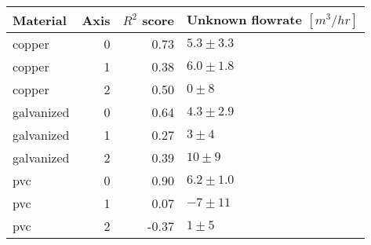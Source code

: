 \begin{tabular}{lrrl}
\toprule
\textbf{Material} & \textbf{Axis} & \textbf{$R^2$ score} & \textbf{Unknown flowrate $[m^3 / hr]$} \\
\midrule
copper & 0 & 0.73 & $5.3 \pm 3.3$ \\
copper & 1 & 0.38 & $6.0 \pm 1.8$ \\
copper & 2 & 0.50 & $0 \pm 8$ \\
galvanized & 0 & 0.64 & $4.3 \pm 2.9$ \\
galvanized & 1 & 0.27 & $3 \pm 4$ \\
galvanized & 2 & 0.39 & $10 \pm 9$ \\
pvc & 0 & 0.90 & $6.2 \pm 1.0$ \\
pvc & 1 & 0.07 & $-7 \pm 11$ \\
pvc & 2 & -0.37 & $1 \pm 5$ \\
\bottomrule
\end{tabular}
